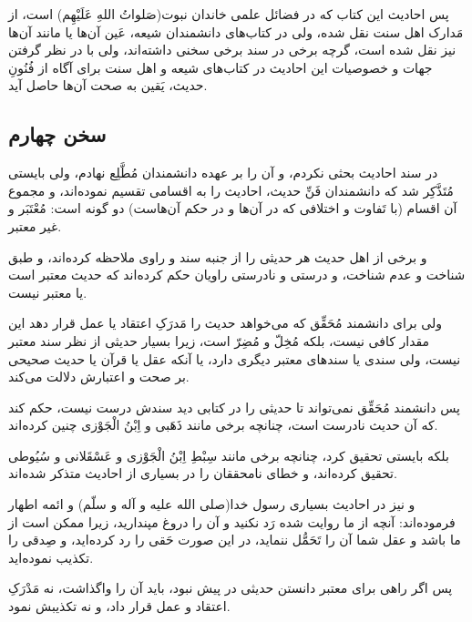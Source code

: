 پس احادیث این کتاب که در فضائل علمی خاندان نبوت(صَلواتُ اللهِ عَلَیْهِم) است،
از مَدارک اهل سنت نقل شده، ولی در کتاب‌های دانشمندان شیعه، عَین آن‌ها یا
مانند آن‌ها نیز نقل شده است، گرچه برخی در سند برخی سخنی داشته‌اند، ولی
با در نظر گرفتن جهات و خصوصیات این احادیث در کتاب‌های شیعه و اهل سنت
برای آگاه از فُنُونِ حدیث، یَقین به صحت آن‌ها حاصل آید.

\subsection*{سخن چهارم}

در سند احادیث بحثی نکردم، و آن را بر عهده دانشمندان مُطَّلِع نهادم، ولی
بایستی مُتَذَّکِر شد که دانشمندان فَنِّ حدیث، احادیث را به اقسامی تقسیم
نموده‌اند، و مجموع آن اقسام (با تَفاوت و اختلافی که در آن‌ها و در حکم
آن‌هاست) دو گونه است: مُعْتَبَر و غیر معتبر.

و برخی از اهل حدیث هر حدیثی را از جنبه سند و راوی ملاحظه کرده‌اند، و
طبق شناخت و عدم شناخت،‌ و درستی و نادرستی راویان حکم کرده‌اند که حدیث
معتبر است یا معتبر نیست.

ولی برای دانشمند مُحَقِّق که می‌خواهد حدیث را مَدرَکِ اعتقاد یا عمل قرار دهد
این مقدار کافی نیست، بلکه مُخِلّ و مُضِرّ است، زیرا بسیار حدیثی از نظر سند
معتبر نیست، ولی سندی یا سندهای معتبر دیگری دارد، یا آنکه عقل یا قرآن
یا حدیث صحیحی بر صحت و اعتبارش دلالت می‌کند.

پس دانشمند مُحَقِّق نمی‌تواند تا حدیثی را در کتابی دید سندش درست نیست، حکم
کند که آن حدیث نادرست است، چنانچه برخی مانند ذَهَبی و اِبْنُ الْجَوْزی چنین
کرده‌اند.

بلکه بایستی تحقیق کرد، چنانچه برخی مانند سِبْطِ اِبْنُ الْجَوْزی و عَسْقَلانی و
سُیُوطی تحقیق کرده‌اند، و خطای نامحققان را در بسیاری از احادیث متذکر
شده‌اند.

و نیز در احادیث بسیاری رسول خدا(صلی الله علیه و آله و سلّم) و ائمه
اطهار فرموده‌اند: آنچه از ما روایت شده رَد نکنید و آن را دروغ مپندارید،
زیرا ممکن است از ما باشد و عقل شما آن را تَحَمُّل ننماید، در این صورت حَقی
را رد کرده‌اید، و صِدقی را تکذیب نموده‌اید.

پس اگر راهی برای معتبر دانستن حدیثی در پیش نبود، باید آن را واگذاشت،
نه مَدْرَکِ اعتقاد و عمل قرار داد، و نه تکذیبش نمود.
